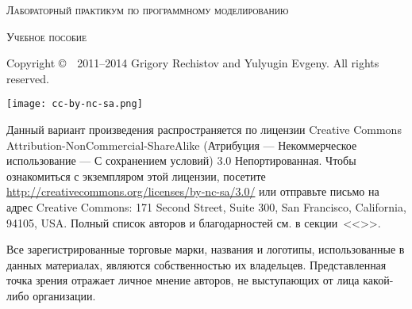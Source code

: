 
\newlength{\centeroffset}
\setlength{\centeroffset}{-0.5\oddsidemargin}
\addtolength{\centeroffset}{0.5\evensidemargin}

\thispagestyle{empty}

\begin{center}
	\Huge\textsc{Лабораторный практикум по программному моделированию}\par

	\vspace{1cm}
	{\Large\textsc{Учебное пособие}}
\end{center}

\noindent\hspace*{\centeroffset}
\pagebreak

\thispagestyle{empty}
\begin{small} 
Copyright \copyright~~2011--2014 Grigory Rechistov and Yulyugin Evgeny.  All rights reserved.
\begin{center}
	\texttt{[image: cc-by-nc-sa.png]}
\end{center}

Данный вариант произведения распространяется по лицензии Creative Commons At\-tri\-bu\-tion-Non\-Com\-mer\-cial-Share\-Alike (Атрибуция — Некоммерческое использование — С сохранением условий) 3.0 Непортированная. Чтобы ознакомиться с экземпляром этой лицензии, посетите \url{http://creativecommons.org/licenses/by-nc-sa/3.0/} или отправьте письмо на адрес Creative Commons: 171 Second Street, Suite 300, San Francisco, California, 94105, USA. 
Полный список авторов и благодарностей см. в секции~<<>>.

Все зарегистрированные торговые марки, названия и логотипы, использованные в данных материалах, являются собственностью их владельцев. Представленная точка зрения отражает личное мнение авторов, не выступающих от лица какой-либо организации.
\end{small}
